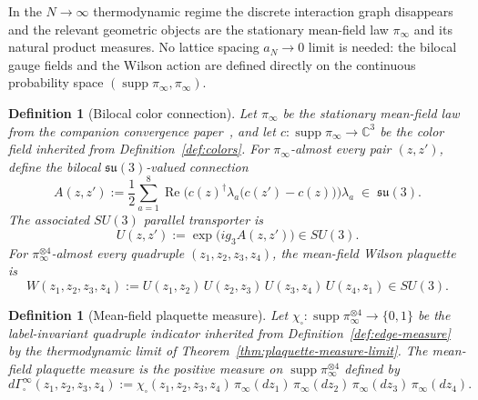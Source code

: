 \documentclass[11pt]{article}
\newtheorem{definition}[theorem]{Definition}
\theoremstyle{remark}
\newcommand{\C}{\mathbb C}
\begin{document}
In the $N\to\infty$ thermodynamic regime the discrete interaction graph
disappears and the relevant geometric objects are the stationary mean-field law
$\pi_\infty$ and its natural product measures.
No lattice spacing $a_N\to0$ limit is needed: the bilocal gauge fields and the
Wilson action are defined directly on the continuous probability space
$(\operatorname{supp}\pi_\infty, \pi_\infty)$.

\begin{definition}[Bilocal color connection]
\label{def:bilocal-connection}
Let $\pi_\infty$ be the stationary mean-field law from the companion convergence
paper~\cite{convergence}, and let $c:\operatorname{supp}\pi_\infty\to\C^3$ be
the color field inherited from Definition~\ref{def:colors}.
For $\pi_\infty$-almost every pair $(z,z')$, define the
\emph{bilocal $\mathfrak{su}(3)$-valued connection}
\[
A(z,z')
:=
\frac12\sum_{a=1}^8
\operatorname{Re}\!\bigl(c(z)^\dagger\lambda_a\bigl(c(z')-c(z)\bigr)\bigr)\lambda_a
\;\in\;\mathfrak{su}(3).
\]
The associated $SU(3)$ parallel transporter is
\[
U(z,z'):=\exp\!\bigl(ig_3 A(z,z')\bigr)\in SU(3).
\]
For $\pi_\infty^{\otimes 4}$-almost every quadruple $(z_1,z_2,z_3,z_4)$, the
\emph{mean-field Wilson plaquette} is
\[
W(z_1,z_2,z_3,z_4)
:=U(z_1,z_2)\,U(z_2,z_3)\,U(z_3,z_4)\,U(z_4,z_1)\in SU(3).
\]
\end{definition}

\begin{definition}[Mean-field plaquette measure]
\label{def:mf-plaquette-measure}
Let $\chi_\square:\operatorname{supp}\pi_\infty^{\otimes 4}\to\{0,1\}$ be the
label-invariant quadruple indicator inherited from Definition~\ref{def:edge-measure}
by the thermodynamic limit of Theorem~\ref{thm:plaquette-measure-limit}.
The \emph{mean-field plaquette measure} is the positive measure on
$\operatorname{supp}\pi_\infty^{\otimes 4}$ defined by
\[
d\Gamma_\square^\infty(z_1,z_2,z_3,z_4)
:=
\chi_\square(z_1,z_2,z_3,z_4)\,
\pi_\infty(dz_1)\,\pi_\infty(dz_2)\,\pi_\infty(dz_3)\,\pi_\infty(dz_4).
\]
\end{definition}
\end{document}
